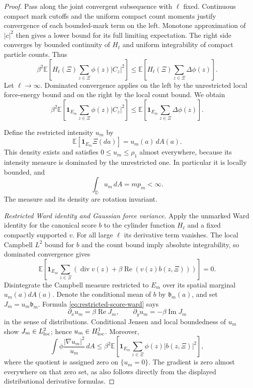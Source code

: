 \documentclass[11pt,a4paper]{article}
\numberwithin{equation}{section}
\theoremstyle{definition}
\theoremstyle{remark}
\newcommand{\D}{\mathbb D}
\newcommand{\E}{\mathbb E}
\begin{document}
\begin{proof}
Pass along the joint convergent subsequence with $\ell$ fixed.
Continuous compact mark cutoffs and the uniform compact count moments
justify convergence of each bounded-mark term on the left. Monotone
approximation of $|c|^2$ then gives a lower bound for its full limiting
expectation. The right side converges by bounded continuity of
$H_\ell$ and uniform integrability of compact particle counts. Thus
\[
 \beta^2\E\left[H_\ell(\Xi)
                \sum_{z\in\Xi}\phi(z)|C_z|^2\right]
 \le\E\left[H_\ell(\Xi)\sum_{z\in\Xi}\Delta\phi(z)\right].
\]
Let $\ell\to\infty$. Dominated convergence applies on the left by the
unrestricted local force-energy bound and on the right by the local
count bound. We obtain
\begin{equation}\label{eq:restricted-limiting-force-energy}
 \beta^2\E\left[\mathbf1_{E_m}
                \sum_{z\in\Xi}\phi(z)|C_z|^2\right]
 \le\E\left[\mathbf1_{E_m}\sum_{z\in\Xi}\Delta\phi(z)\right].
\end{equation}

Define the restricted intensity $u_m$ by
\[
 \E\left[\mathbf1_{E_m}\Xi(da)\right]=u_m(a)\,dA(a).
\]
This density exists and satisfies $0\le u_m\le\rho_1$ almost everywhere,
because its intensity measure is dominated by the unrestricted one.
In particular it is locally bounded, and
\begin{equation}\label{eq:restricted-intensity-mass}
 \int_\D u_m\,dA=m p_m<\infty.
\end{equation}
The measure and its density are rotation invariant.

\medskip\noindent
\emph{Restricted Ward identity and Gaussian force variance.}
Apply the unmarked Ward identity for the canonical score $b$ to the
cylinder function $H_\ell$ and a fixed compactly supported $v$.
For all large $\ell$ its derivative term vanishes. The local Campbell
$L^2$ bound for $b$ and the count bound imply absolute integrability,
so dominated convergence gives
\begin{equation}\label{eq:restricted-score-ward}
 \E\left[\mathbf1_{E_m}\sum_{z\in\Xi}
    \left(\operatorname{div}v(z)
                  +\beta\operatorname{Re}(v(z)b(z,\Xi))\right)\right]=0.
\end{equation}
Disintegrate the Campbell measure restricted to $E_m$ over its spatial
marginal $u_m(a)dA(a)$. Denote the conditional mean of $b$ by
$\mathfrak b_m(a)$, and set $J_m=u_m\mathfrak b_m$. Formula
\eqref{eq:restricted-score-ward} says
\[
 \partial_xu_m=\beta\operatorname{Re}J_m,
 \qquad \partial_yu_m=-\beta\operatorname{Im}J_m
\]
in the sense of distributions. Conditional Jensen and local boundedness
of $u_m$ show $J_m\in L^2_{\rm loc}$; hence $u_m\in H^1_{\rm loc}$.
Moreover,
\begin{equation}\label{eq:restricted-fisher-score}
 \int\phi\frac{|\nabla u_m|^2}{u_m}\,dA
 \le\beta^2\E\left[\mathbf1_{E_m}
                    \sum_{z\in\Xi}\phi(z)|b(z,\Xi)|^2\right],
\end{equation}
where the quotient is assigned zero on $\{u_m=0\}$. The gradient is
zero almost everywhere on that zero set, as also follows directly
from the displayed distributional derivative formulas.


\end{proof}
\end{document}
